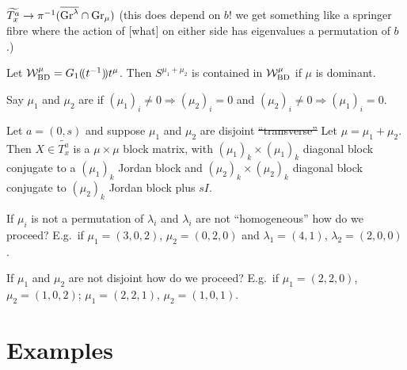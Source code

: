 \documentclass{article}
\begin{document}
\begin{claim}
$\widetilde{T_x^a}\to\pi^{-1}(\overline{\Gr^\lambda}\cap\Gr_\mu)$ (this does depend on $b$! we get something like a springer fibre where the action of [what] on either side has eigenvalues a permutation of $b$.)
\end{claim}

\begin{claim}
Let $\cW^\mu_{\rm BD} = G_1\xT[t^{-1}]t^\mu$. Then $S^{\mu_1 + \mu_2}$ is contained in $\cW^\mu_{\rm BD}$ if $\mu$ is dominant.  
\end{claim}

\begin{definition}
    Say $\mu_1$ and $\mu_2$ are  if $(\mu_1)_i\ne 0 \Rightarrow (\mu_2)_i = 0$ and $(\mu_2)_i\ne 0 \Rightarrow (\mu_1)_i = 0$. 
\end{definition}

\begin{claim}
Let $a = (0,s)$ and suppose $\mu_1$ and $\mu_2$ are disjoint \sout{``transverse''} 
Let $\mu = \mu_1 + \mu_2$. Then $X\in\widetilde{T_x^a}$ is a $\mu\times\mu$ block matrix, with $(\mu_1)_k\times(\mu_1)_k$ diagonal block conjugate to a $(\mu_1)_k$ Jordan block and $(\mu_2)_k\times (\mu_2)_k$ diagonal block conjugate to $(\mu_2)_k$ Jordan block plus $sI$.
\end{claim}

\begin{question}
If $\mu_i$ is not a permutation of $\lambda_i$ and $\lambda_i$ are not ``homogeneous'' how do we proceed? E.g.\ if $\mu_1 = (3,0,2)$, $\mu_2 = (0,2,0)$ and $\lambda_1 = (4,1)$, $\lambda_2 = (2,0,0)$. 
\end{question}

\begin{question}
If $\mu_1$ and $\mu_2$ are not disjoint how do we proceed? E.g.\ if $\mu_1 = (2,2,0)$, $\mu_2 = (1,0,2)$; $\mu_1 = (2,2,1)$, $\mu_2 = (1,0,1)$.
\end{question}

\section{Examples}
\end{document}
